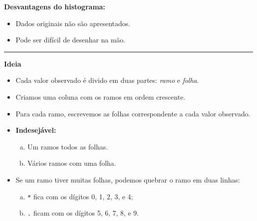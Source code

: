 \documentclass[
  10pt,
  ignorenonframetext,
]{beamer}
\providecommand{\tightlist}{%
  \setlength{\itemsep}{0pt}\setlength{\parskip}{0pt}}\usepackage{longtable,booktabs,array}
\newcommand*{\destaque}[1]{%
    \colorbox{cabecalho}{\textcolor{titulo}{#1}}
}
\newcommand*{\regrafina}{\rule{\textwidth}{0.5pt}}
\begin{document}
\begin{frame}[fragile]
\textbf{Desvantagens do histograma:}

\begin{itemize}
\tightlist
\item
  Dados originais não são apresentados.
\item
  Pode ser difícil de desenhar na mão.
\end{itemize}

\regrafina

\destaque{\large\bf Ideia}

\begin{itemize}
\tightlist
\item
  Cada valor observado é divido em duas partes: \emph{ramo} e
  \emph{folha}.
\item
  Criamos uma coluna com os ramos em ordem crescente.
\item
  Para cada ramo, escrevemos as folhas correspondente a cada valor
  observado.
\item
  \textbf{Indesejável:}

  \begin{enumerate}
  [a.]
  \tightlist
  \item
    Um ramos todos as folhas.
  \item
    Vários ramos com uma folha.
  \end{enumerate}
\item
  Se um ramo tiver muitas folhas, podemos quebrar o ramo em duas linhas:

  \begin{enumerate}
  [a.]
  \tightlist
  \item
    \texttt{*} fica com os dígitos 0, 1, 2, 3, e 4;
  \item
    \texttt{.} ficam com os dígitos 5, 6, 7, 8, e 9.
  \end{enumerate}
\end{itemize}
\end{frame}
\end{document}
